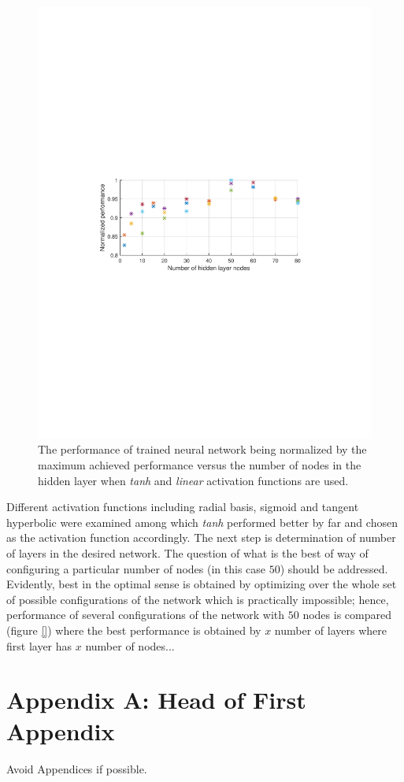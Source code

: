 \documentclass[twocolumn,10pt]{asme2e}
\begin{document}
\begin{figure}[t]
	\centering
	\includegraphics[width=1\linewidth]{./Figures/perf1}
	\caption{ The performance of trained neural network being normalized by the maximum achieved performance versus the number of nodes in the hidden layer when \emph{tanh} and \emph{linear} activation functions are used. }
	\label{fig:perf1}
\end{figure} 

 Different activation functions including radial basis, sigmoid and tangent hyperbolic were examined among which \textit{tanh} performed better by far and chosen as the activation function accordingly.  
The next step is determination of number of layers in the desired network. The question of what is the best of way of configuring a particular number of nodes (in this case $50$) should be addressed. Evidently, best in the optimal sense is obtained by optimizing over the whole set of possible configurations of the network which is practically impossible; hence, performance of several configurations of the network with $50$ nodes is compared (figure \ref{}) where the best performance is obtained by $x$ number of layers where first layer has $x$ number of nodes...

 





\appendix       %
\section*{Appendix A: Head of First Appendix}
Avoid Appendices if possible.
\end{document}

